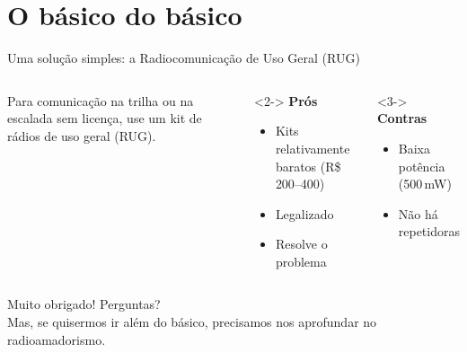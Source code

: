 
\section{O básico do básico}

\begin{frame}{Uma solução simples: a Radiocomunicação de Uso Geral (RUG)}
  \begin{columns}[T,onlytextwidth]
      Para comunicação na trilha ou na escalada sem licença, use um \alert{kit de rádios de uso geral} (RUG).

      \vspace{.5em}
      \begin{uncoverenv}<2->
        \textbf{Prós}
        \begin{itemize}
        \item Kits relativamente baratos (R\$ 200–400)
        \item Legalizado \citep{anatel2017}
        \item Resolve o problema
        \end{itemize}
      \end{uncoverenv}

      \begin{uncoverenv}<3->
        \textbf{Contras}
        \begin{itemize}
        \item Baixa potência (500\,mW)
        \item Não há repetidoras
        \end{itemize}
      \end{uncoverenv}

  \end{columns}
\end{frame}

\begin{frame}[standout]
  Muito obrigado! Perguntas? \\[.5em] \pause Mas, se quisermos ir além do básico, precisamos nos aprofundar no \alert{radioamadorismo}.
\end{frame}

